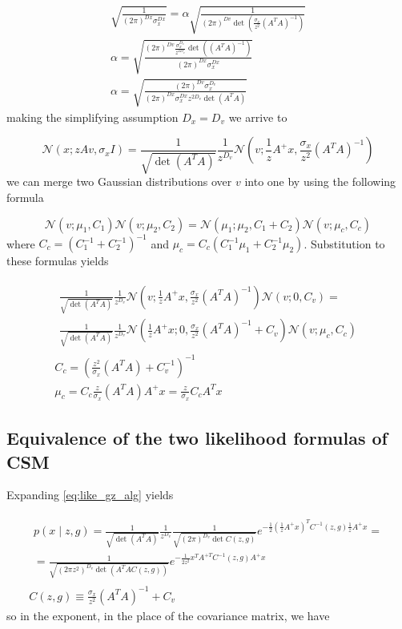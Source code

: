 \documentclass{paper}
\begin{document}
\begin{eqnarray}
\sqrt{\frac{1}{(2\pi)^{Dx} \sigma_x^{Dx}}} = \alpha \sqrt{\frac{1}{(2\pi)^{Dv} \det(\frac{\sigma_x}{z^2} (A^TA)^{-1})}} \\
\alpha = \sqrt{\frac{ (2\pi)^{Dv} \frac{\sigma_x^{D_v}}{z^{2D_v}} \det( (A^TA)^{-1}) }{ (2\pi)^{Dx} \sigma_x^{Dx} }} \\
\alpha = \sqrt{\frac{ (2\pi)^{Dv} \sigma_x^{D_v} }{ (2\pi)^{Dx} \sigma_x^{Dx} z^{2D_v} \det(A^TA)}}
\end{eqnarray}
%
making the simplifying assumption $D_x = D_v$ we arrive to

\begin{equation} 
\mathcal{N}(x;zAv,\sigma_x I) = \frac{1}{\sqrt{\det(A^TA)}} \frac{1}{z^{D_v}} \mathcal{N}(v;\frac{1}{z}A^{+}x,\frac{\sigma_x}{z^2} (A^TA)^{-1})
\end{equation}
%
we can merge two Gaussian distributions over $v$ into one by using the following formula

\begin{equation} 
\mathcal{N}(v;\mu_1,C_1) \mathcal{N}(v;\mu_2,C_2) = \mathcal{N}(\mu_1;\mu_2,C_1 + C_2) \mathcal{N}(v; \mu_c,C_c)
\end{equation}
%
where $C_c = (C_1^{-1} + C_2^{-1})^{-1}$ and $\mu_c = C_c (C_1^{-1}\mu_1 + C_2^{-1}\mu_2)$. Substitution to these formulas yields

\begin{eqnarray}
\begin{split}
 \frac{1}{\sqrt{\det(A^TA)}} \frac{1}{z^{D_v}} \mathcal{N}(v;\frac{1}{z}A^{+}x,\frac{\sigma_x}{z^2} (A^TA)^{-1})\mathcal{N}(v;0,C_v) = \\
\frac{1}{\sqrt{\det(A^TA)}} \frac{1}{z^{D_v}} \mathcal{N}(\frac{1}{z}A^{+}x;0,\frac{\sigma_x}{z^2} (A^TA)^{-1} + C_v) \mathcal{N}(v; \mu_c,C_c)
 \end{split} \\
 C_c = (\frac{z^2}{\sigma_x} (A^TA) + C_v^{-1})^{-1} \\
 \mu_c = C_c \frac{z}{\sigma_x} (A^TA) A^{+}x = \frac{z}{\sigma_x} C_c A^{T}x
\end{eqnarray}


\subsection{Equivalence of the two likelihood formulas of CSM} \label{seq:like_equiv}

Expanding \ref{eq:like_gz_alg} yields

\begin{eqnarray}
\begin{split}
p(x \mid z,g) = \frac{1}{\sqrt{\det(A^TA)}} \frac{1}{z^{D_v}} \frac{1}{\sqrt{ (2\pi)^{D_v} \det C(z,g) }} e^{-\frac{1}{2} \left( \frac{1}{z}A^{+}x \right)^T C^{-1}(z,g) \frac{1}{z}A^{+}x}  = \\
= \frac{1}{\sqrt{ (2\pi z^2)^{D_v} \det(A^TA C(z,g))}} e^{-\frac{1}{2z^2} x^TA^{+T} C^{-1}(z,g) A^{+}x}
\end{split} \\
C(z,g) \equiv \frac{\sigma_x}{z^2} (A^TA)^{-1} + C_v
\end{eqnarray}
%
so in the exponent, in the place of the covariance matrix, we have
\end{document}
